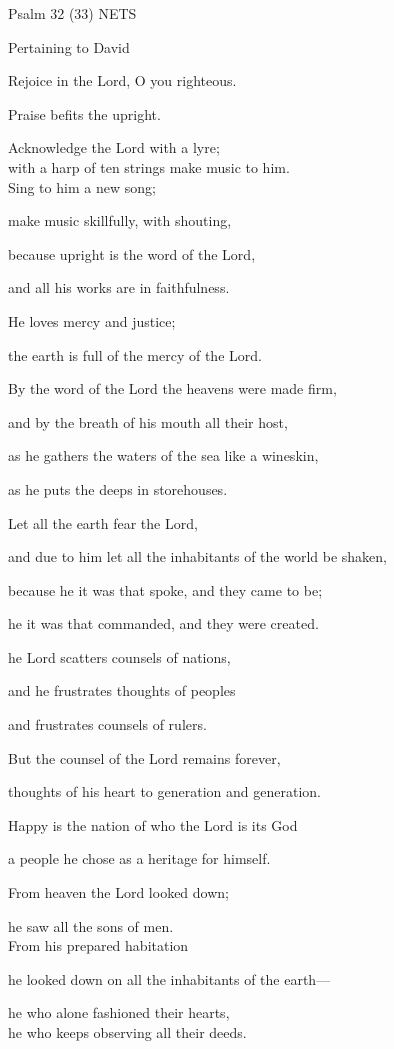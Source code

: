 \documentclass[
]{article}
\begin{document}
Psalm 32 (33) NETS

Pertaining to David

Rejoice in the Lord, O you righteous.

Praise befits the upright.

Acknowledge the Lord with a lyre;\\
with a harp of ten strings make music to him.\\
Sing to him a new song;

make music skillfully, with shouting,

because upright is the word of the Lord,

and all his works are in faithfulness.

He loves mercy and justice;

the earth is full of the mercy of the Lord.

By the word of the Lord the heavens were made firm,

and by the breath of his mouth all their host,

as he gathers the waters of the sea like a wineskin,

as he puts the deeps in storehouses.

Let all the earth fear the Lord,

and due to him let all the inhabitants of the world be shaken,

because he it was that spoke, and they came to be;

he it was that commanded, and they were created.

he Lord scatters counsels of nations,

and he frustrates thoughts of peoples

and frustrates counsels of rulers.

But the counsel of the Lord remains forever,

thoughts of his heart to generation and generation.

Happy is the nation of who the Lord is its God

a people he chose as a heritage for himself.

From heaven the Lord looked down;

he saw all the sons of men.\\
From his prepared habitation

he looked down on all the inhabitants of the earth---

he who alone fashioned their hearts,\\
he who keeps observing all their deeds.
\end{document}
